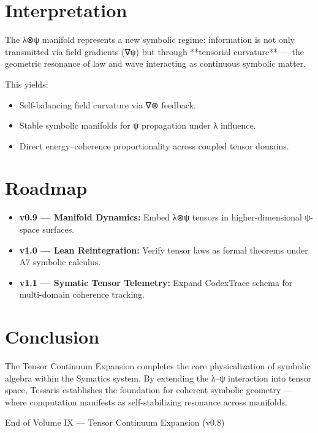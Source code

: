 \documentclass[11pt]{article}
\begin{document}
\section{Interpretation}
The λ⊗ψ manifold represents a new symbolic regime:  
information is not only transmitted via field gradients (∇ψ) but through **tensorial curvature** — the geometric resonance of law and wave interacting as continuous symbolic matter.  

This yields:
\begin{itemize}
\item Self-balancing field curvature via ∇⊗ feedback.  
\item Stable symbolic manifolds for ψ propagation under λ influence.  
\item Direct energy–coherence proportionality across coupled tensor domains.  
\end{itemize}

\section{Roadmap}
\begin{itemize}
\item \textbf{v0.9 — Manifold Dynamics:} Embed λ⊗ψ tensors in higher-dimensional ψ-space surfaces.  
\item \textbf{v1.0 — Lean Reintegration:} Verify tensor laws as formal theorems under A7 symbolic calculus.  
\item \textbf{v1.1 — Symatic Tensor Telemetry:} Expand CodexTrace schema for multi-domain coherence tracking.  
\end{itemize}

\section*{Conclusion}
The Tensor Continuum Expansion completes the core physicalization of symbolic algebra within the Symatics system.  
By extending the λ–ψ interaction into tensor space, Tessaris establishes the foundation for coherent symbolic geometry — where computation manifests as self-stabilizing resonance across manifolds.

\vfill
\begin{center}
{\small End of Volume IX — Tensor Continuum Expansion (v0.8)}\\[3pt]
{\color{tessarisgray}{Maintainer: Tessaris Core Systems • October 2025}}
\end{center}
\end{document}
